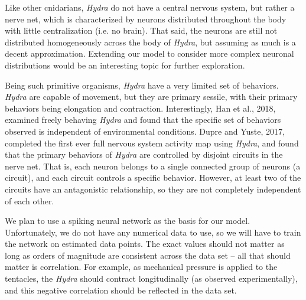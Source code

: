 \documentclass{article}
\begin{document}
Like other cnidarians, \textit{Hydra} do not have a central nervous system, but rather a nerve net, which is characterized by neurons distributed throughout the body with little centralization (i.e. no brain). That said, the neurons are still not distributed homogeneously across the body of \textit{Hydra}, but assuming as much is a decent approximation. Extending our model to consider more complex neuronal distributions would be an interesting topic for further exploration.

Being such primitive organisms, \textit{Hydra} have a very limited set of behaviors. \textit{Hydra} are capable of movement, but they are primary sessile, with their primary behaviors being elongation and contraction. Interestingly, Han et al., 2018, examined freely behaving \textit{Hydra} and found that the specific set of behaviors observed is independent of environmental conditions. Dupre and Yuste, 2017, completed the first ever full nervous system activity map using \textit{Hydra}, and found that the primary behaviors of \textit{Hydra} are controlled by disjoint circuits in the nerve net. That is, each neuron belongs to a single connected group of neurons (a circuit), and each circuit controls a specific behavior. However, at least two of the circuits have an antagonistic relationship, so they are not completely independent of each other.

We plan to use a spiking neural network as the basis for our model. Unfortunately, we do not have any numerical data to use, so we will have to train the network on estimated data points. The exact values should not matter as long as orders of magnitude are consistent across the data set – all that should matter is correlation. For example, as mechanical pressure is applied to the tentacles, the \textit{Hydra} should contract longitudinally (as observed experimentally), and this negative correlation should be reflected in the data set.

\end{document}

